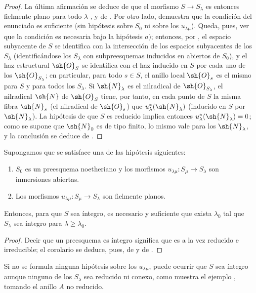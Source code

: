 \begin{proof}
La última afirmación se deduce de que el morfismo $S\to S_\lambda$ es entonces fielmente plano para todo $\lambda$ , y de .
Por otro lado,  demuestra que la condición del enunciado es suficiente (sin hipótesis sobre $S_0$ ni sobre los $u_{\lambda\mu}$).
Queda, pues, ver que la condición es necesaria bajo la hipótesis $a)$; entonces, por , el espacio subyacente de $S$ se identifica con la intersección de los espacios subyacentes de los $S_\lambda$ (identificándose los $S_\lambda$ con subpreesquemas inducidos en abiertos de $S_0$), y el haz estructural $\sh{O}_S$ se identifica con
el haz inducido en $S$ por cada uno de los $\sh{O}_{S_\lambda}$; en particular, para todo $s\in S$, el anillo local $\sh{O}_s$ es el mismo para $S$ y para todos los $S_\lambda$.
Si $\sh{N}_\lambda$ es el nilradical de $\sh{O}_{S_\lambda}$, el nilradical $\sh{N}$ de $\sh{O}_S$ tiene, por tanto, en cada punto de $S$ la misma fibra $\sh{N}_s$ (el nilradical de $\sh{O}_s$) que $u_\lambda^*(\sh{N}_\lambda)$ (inducido en $S$ por $\sh{N}_\lambda$).
La hipótesis de que $S$ es reducido implica entonces $u_\lambda^*(\sh{N}_\lambda)=0$; como se supone que $\sh{N}_0$ es de tipo finito, lo mismo vale para los $\sh{N}_\lambda$, y la conclusión se deduce de .
\end{proof}

\begin{corollary}[8.7.3]
\label{IV.8.7.3}
Supongamos que se satisface una de las hipótesis siguientes:
\begin{enumerate}[label=\emph{\alph*)}]
\item $S_0$ es un preesquema noetheriano y los morfismos $u_{\lambda\mu}:S_\mu\to S_\lambda$ son inmersiones abiertas.
\item Los morfismos $u_{\lambda\mu}:S_\mu\to S_\lambda$ son fielmente planos.
\end{enumerate}
Entonces, para que $S$ sea íntegro, es necesario y suficiente que exista $\lambda_0$ tal que $S_\lambda$ sea íntegro para $\lambda\geqslant\lambda_0$.
\end{corollary}

\begin{proof}
Decir que un preesquema es íntegro significa que es a la vez reducido e irreducible; el corolario se deduce, pues, de  y de .
\end{proof}

\begin{remark}[8.7.4]
\label{IV.8.7.4}
Si no se formula ninguna hipótesis sobre los $u_{\lambda\mu}$, puede ocurrir que $S$ sea íntegro aunque ninguno de los $S_\lambda$ sea reducido ni conexo, como muestra el ejemplo , tomando el anillo $A$ no reducido.
\end{remark}

